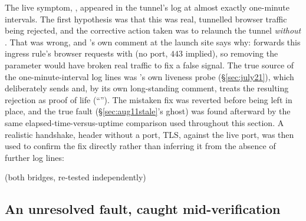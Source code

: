 The live symptom, , appeared
in the tunnel's log at almost exactly one-minute intervals. The first
hypothesis was that this was real, tunnelled browser traffic being rejected,
and the corrective action taken was to relaunch the tunnel \emph{without}
. That was wrong, and 's own
comment at the launch site says why:  forwards this
ingress rule's browser requests with 
(no port, $443$ implied), so removing the parameter would have broken real
traffic to fix a false signal. The true source of the one-minute-interval
log lines was 's own liveness probe
(\S\ref{sec:july21}), which deliberately sends 
and, by its own long-standing comment, treats the resulting rejection as
proof of life (``''). The mistaken fix was reverted
before being left in place, and the true fault (\S\ref{sec:aug11stale}'s
 ghost) was found afterward by the same
elapsed-time-versus-uptime comparison used throughout this section. A
realistic handshake,  header without a port, TLS, against the
live port, was then used to confirm the fix directly rather than inferring
it from the absence of further log lines:
\begin{center}
 \quad (both bridges, re-tested independently)
\end{center}

\subsection{An unresolved fault, caught mid-verification}
\label{sec:aug11mins}

